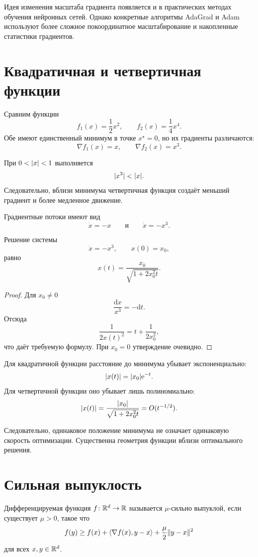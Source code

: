Идея изменения масштаба градиента появляется и в практических
методах обучения нейронных сетей. Однако конкретные алгоритмы
AdaGrad и Adam используют более сложное покоординатное масштабирование
и накопленные статистики градиентов.

\section{Квадратичная и четвертичная функции}

Сравним функции
\[
    f_1(x)=\frac12x^2,
    \qquad
    f_2(x)=\frac14x^4.
\]
Обе имеют единственный минимум в точке \(x^\star=0\), но их градиенты
различаются:
\[
    \nabla f_1(x)=x,
    \qquad
    \nabla f_2(x)=x^3.
\]

При \(0<\lvert x\rvert<1\) выполняется
\[
    \lvert x^3\rvert<\lvert x\rvert.
\]
Следовательно, вблизи минимума четвертичная функция создаёт меньший
градиент и более медленное движение.

Градиентные потоки имеют вид
\[
    \dot{x}=-x
    \qquad\text{и}\qquad
    \dot{x}=-x^3.
\]

\begin{lemma}
Решение системы
\[
    \dot{x}=-x^3,
    \qquad
    x(0)=x_0,
\]
равно
\[
    x(t)
    =
    \frac{x_0}
         {\sqrt{1+2x_0^2t}}.
\]
\end{lemma}

\begin{proof}
Для \(x_0\ne0\)
\[
    \frac{\mathrm{d}x}{x^3}=-\mathrm{d}t.
\]
Отсюда
\[
    \frac{1}{2x(t)^2}
    =
    t+\frac{1}{2x_0^2},
\]
что даёт требуемую формулу. При \(x_0=0\) утверждение очевидно.
\end{proof}

Для квадратичной функции расстояние до минимума убывает
экспоненциально:
\[
    \lvert x(t)\rvert=\lvert x_0\rvert\mathrm{e}^{-t}.
\]
Для четвертичной функции оно убывает лишь полиномиально:
\[
    \lvert x(t)\rvert
    =
    \frac{\lvert x_0\rvert}
         {\sqrt{1+2x_0^2t}}
    =
    O(t^{-1/2}).
\]

Следовательно, одинаковое положение минимума не означает одинаковую
скорость оптимизации. Существенна геометрия функции вблизи
оптимального решения.

\section{Сильная выпуклость}

\begin{definition}
Дифференцируемая функция \(f\colon\mathbb{R}^d\to\mathbb{R}\) называется
\(\mu\)-сильно выпуклой, если существует \(\mu>0\), такое что
\[
    f(y)
    \ge
    f(x)
    +
    \left\langle \nabla f(x),y-x \right\rangle
    +
    \frac{\mu}{2}\lVert y-x\rVert^2
\]
для всех \(x,y\in\mathbb{R}^d\).
\end{definition}

